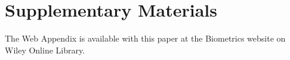 \documentclass[useAMS,usenatbib,referee]{biom}
\begin{document}






\section*{Supplementary Materials}

The Web Appendix is available with this paper at the Biometrics website on Wiley Online Library.\vspace*{-8pt}

\label{lastpage}
\end{document}
